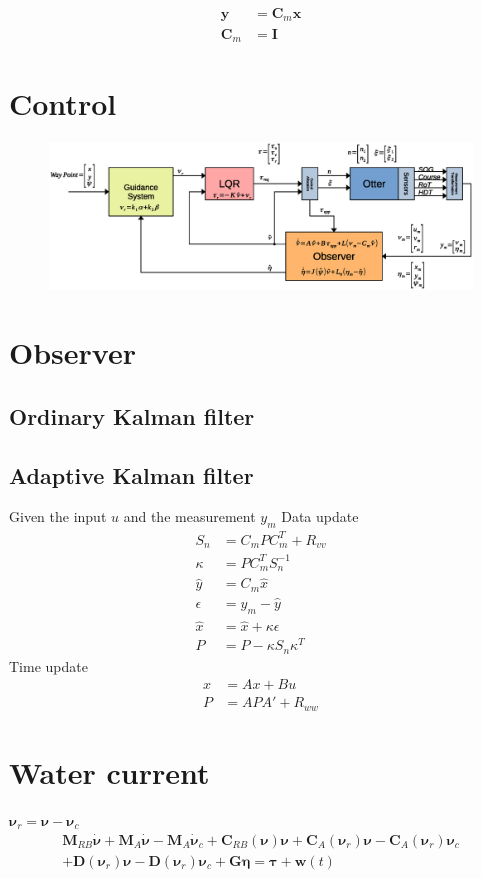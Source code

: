\documentclass[12pt,a4]{article}
\begin{document}
\begin{align}
	\bm{y}   & = \bm{C}_m \bm{x} \\
	\bm{C}_m & = \bm{I}
\end{align}

\section{Control}
\begin{figure}[H]
	\includegraphics[width = \textwidth]{graphics/BlokDiagram.eps}
	\caption{}
	\label{}
\end{figure}

\section{Observer}

\subsection{Ordinary Kalman filter}

\subsection{Adaptive Kalman filter}
Given the input $u$ and the measurement $y_m$
Data update
\begin{align*}
	S_n      & = C_m P C_m^T + R_{vv}      \\
	\kappa   & = P C_m^T S_n^{-1}          \\
	\hat{y}  & = C_m \hat{x}               \\
	\epsilon & = y_m - \hat{y}             \\
	\hat{x}  & = \hat{x} + \kappa \epsilon \\
	P        & = P - \kappa S_n \kappa^T
\end{align*}
Time update
\begin{align*}
	x & = A x + B u       \\
	P & = A P A' + R_{ww}
\end{align*}

\section{Water current}
$\bm{\nu}_r = \bm{\nu} - \bm{\nu}_c$
\begin{multline}
	\label{eq:standard_nu}
	\bm{M}_{RB}\bm{\dot{\nu}} + \bm{M}_{A}\bm{\dot{\nu}} - \bm{M}_{A}\bm{\dot{\nu}}_c + \bm{C}_{RB}(\bm{\nu})\bm{\nu}
	+ \bm{C}_{A}(\bm{\nu}_r)\bm{\nu} -  \bm{C}_{A}(\bm{\nu}_r)\bm{\nu}_c \\
	+ \bm{D}(\bm{\nu}_r) \bm{\nu} - \bm{D}(\bm{\nu}_r) \bm{\nu}_c  +\bm{G}\bm{\eta} = \bm{\tau} + \bm{w}(t)
\end{multline}
\end{document}
